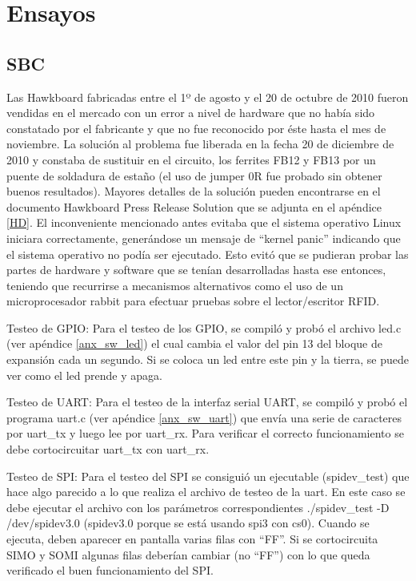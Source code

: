 \chapter{Ensayos}

\section{SBC}
Las Hawkboard fabricadas entre el 1º de agosto y el 20 de octubre de 2010 fueron vendidas en el mercado con 
un error a nivel de hardware que no había sido constatado por el fabricante y que no fue reconocido por éste
hasta el mes de noviembre. La solución al problema fue liberada en la fecha 20 de diciembre de 2010 y constaba de sustituir en el circuito, los ferrites FB12 y FB13 por un puente de soldadura de estaño (el uso de jumper 0R fue probado sin obtener buenos resultados). Mayores detalles de la solución pueden encontrarse en el documento Hawkboard Press Release Solution que se adjunta en el apéndice \ref{HD}.
El inconveniente mencionado antes evitaba que el sistema operativo Linux iniciara correctamente, generándose un mensaje de “kernel panic” indicando que el sistema operativo no podía ser ejecutado. Esto evitó que se pudieran probar las partes de hardware y software que se tenían desarrolladas hasta ese entonces, teniendo que recurrirse a mecanismos alternativos como el uso de un microprocesador rabbit para efectuar pruebas sobre el lector/escritor RFID.

\bigskip
\bigskip
{}

Testeo de GPIO: Para el testeo de los GPIO, se compiló y probó el archivo led.c (ver apéndice \ref{anx_sw_led}) el cual cambia el valor del pin 13 del bloque de expansión cada un segundo. Si se coloca un led entre este pin y la tierra, se puede ver como el led prende y apaga.

\bigskip
Testeo de UART: Para el testeo de la interfaz serial UART, se compiló y probó el programa uart.c
(ver apéndice \ref{anx_sw_uart}) que envía una serie de caracteres por uart\_tx y luego lee por uart\_rx. Para verificar
el correcto funcionamiento se debe cortocircuitar uart\_tx con uart\_rx.

\bigskip
Testeo de SPI: Para el testeo del SPI se consiguió un ejecutable (spidev\_test) que hace algo parecido
a lo que realiza el archivo de testeo de la uart. En este caso se debe ejecutar el archivo con los
parámetros correspondientes ./spidev\_test -D /dev/spidev3.0 (spidev3.0 porque se está usando spi3
con cs0). Cuando se ejecuta, deben aparecer en pantalla varias filas con “FF”. Si
se cortocircuita SIMO y SOMI algunas filas deberían cambiar (no “FF”) con lo que queda
verificado el buen funcionamiento del SPI.


